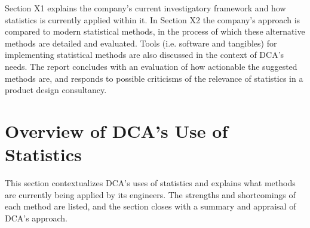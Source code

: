 \documentclass[11pt,a4paper,article]{memoir} %
\begin{document}
\par
Section X1 explains the company's current investigatory framework and how statistics is currently applied within it. In Section X2 the company's approach is compared to modern statistical methods, in the process of which these alternative methods are detailed and evaluated. Tools (i.e. software and tangibles) for implementing statistical methods are also discussed in the context of DCA's needs. The report concludes with an evaluation of how actionable the suggested methods are, and responds to possible criticisms of the relevance of statistics in a product design consultancy.

\newpage



\chapter {Overview of DCA's Use of Statistics}
This section contextualizes DCA's uses of statistics and explains what methods are currently being applied by its engineers. The strengths and shortcomings of each method are listed, and the section closes with a summary and appraisal of DCA's approach.
\end{document}
